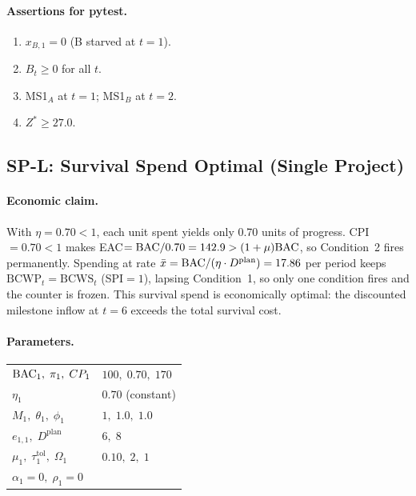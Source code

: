 \paragraph{Assertions for pytest.}
\begin{enumerate}[label=A\arabic*.]
  \item $x_{B,1}=0$ (B starved at $t=1$).
  \item $B_t\geq0$ for all $t$.
  \item MS1$_A$ at $t=1$; MS1$_B$ at $t=2$.
  \item $Z^*\geq27.0$.
\end{enumerate}

\subsection{SP-L: Survival Spend Optimal (Single Project)}

\paragraph{Economic claim.}
With $\eta=0.70<1$, each unit spent yields only 0.70 units of
progress. CPI$=0.70<1$ makes EAC$=\mathrm{BAC}/0.70=142.9>(1+\mu)\mathrm{BAC}$,
so Condition~2 fires permanently. Spending at rate
$\bar x = \mathrm{BAC}/(\eta\cdot D^{\mathrm{plan}})=17.86$ per period keeps
$\mathrm{BCWP}_t = \mathrm{BCWS}_t$ (SPI$=1$), lapsing Condition~1,
so only one condition fires and the counter is frozen. This survival
spend is economically optimal: the discounted milestone inflow at
$t=6$ exceeds the total survival cost.

\paragraph{Parameters.}
\begin{center}
\begin{tabular}{ll}
\toprule
$\mathrm{BAC}_1,\;\pi_1,\;CP_1$ & $100,\;0.70,\;170$\\
$\eta_1$ & $0.70$ (constant)\\
$M_1,\;\theta_1,\;\phi_1$ & $1,\;1.0,\;1.0$\\
$e_{1,1},\;D^{\mathrm{plan}}$ & $6,\;8$\\
$\mu_1,\;\tau_1^{\mathrm{tol}},\;\Omega_1$ & $0.10,\;2,\;1$\\
$\alpha_1=0,\;\rho_1=0$ & \\
\bottomrule
\end{tabular}
\end{center}

